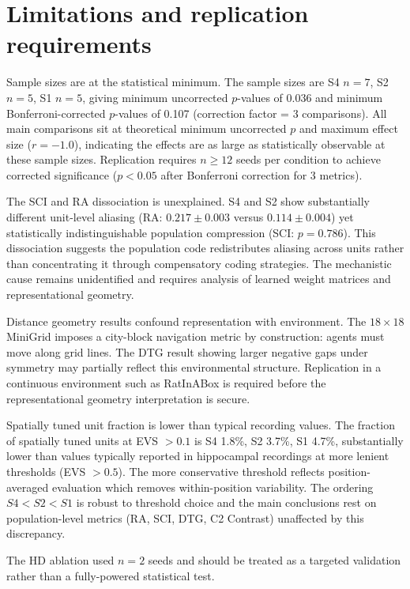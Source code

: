 \documentclass[11pt, a4paper]{article}
\begin{document}
\section*{Limitations and replication requirements}

Sample sizes are at the statistical minimum. The sample sizes are S4 $n=7$, S2 $n=5$, S1 $n=5$, giving minimum uncorrected $p$-values of 0.036 and minimum Bonferroni-corrected $p$-values of 0.107 (correction factor = 3 comparisons). All main comparisons sit at theoretical minimum uncorrected $p$ and maximum effect size ($r = -1.0$), indicating the effects are as large as statistically observable at these sample sizes. Replication requires $n \geq 12$ seeds per condition to achieve corrected significance ($p < 0.05$ after Bonferroni correction for 3 metrics).

The SCI and RA dissociation is unexplained. S4 and S2 show substantially different unit-level aliasing (RA: $0.217 \pm 0.003$ versus $0.114 \pm 0.004$) yet statistically indistinguishable population compression (SCI: $p = 0.786$). This dissociation suggests the population code redistributes aliasing across units rather than concentrating it through compensatory coding strategies. The mechanistic cause remains unidentified and requires analysis of learned weight matrices and representational geometry.

Distance geometry results confound representation with environment. The $18 \times 18$ MiniGrid imposes a city-block navigation metric by construction: agents must move along grid lines. The DTG result showing larger negative gaps under symmetry may partially reflect this environmental structure. Replication in a continuous environment such as RatInABox is required before the representational geometry interpretation is secure.

Spatially tuned unit fraction is lower than typical recording values. The fraction of spatially tuned units at EVS $> 0.1$ is S4 1.8\%, S2 3.7\%, S1 4.7\%, substantially lower than values typically reported in hippocampal recordings at more lenient thresholds (EVS $> 0.5$). The more conservative threshold reflects position-averaged evaluation which removes within-position variability. The ordering $S4 < S2 < S1$ is robust to threshold choice and the main conclusions rest on population-level metrics (RA, SCI, DTG, C2 Contrast) unaffected by this discrepancy.

The HD ablation used $n=2$ seeds and should be treated as a targeted validation rather than a fully-powered statistical test.
\end{document}
